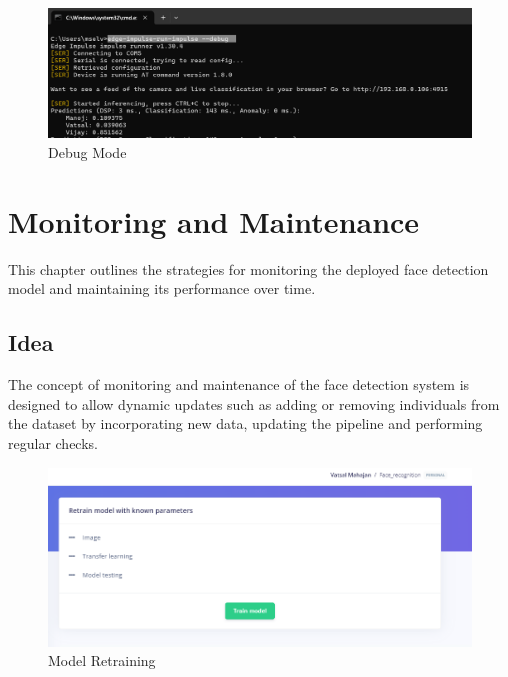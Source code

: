 \begin{figure}
	\begin{center}
		\includegraphics[width=0.7\linewidth]{Images/EdgeImpulse/impulse_debug.png}
		\caption{Debug Mode}
		\label{debug}
	\end{center}
\end{figure}

\chapter{Monitoring and Maintenance}
This chapter outlines the strategies for monitoring the deployed face detection model and maintaining its performance over time.

\section{Idea}
The concept of monitoring and maintenance of the face detection system is designed to allow dynamic updates such as adding or removing individuals from the dataset by incorporating new data, updating the pipeline and performing regular checks.

\begin{figure}
	\begin{center}
		\includegraphics[width=0.7\linewidth]{Images/EdgeImpulse/RetrainModel.png}
		\caption{Model Retraining}
		\label{RetrainModel}
	\end{center}
\end{figure}

